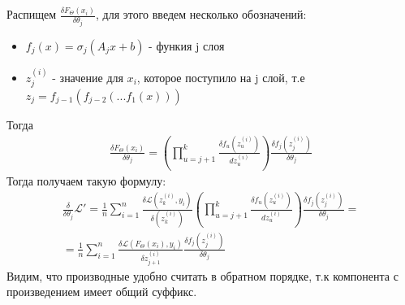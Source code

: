 \documentclass{article}
\newcommand{\Li}{\mathscr{L}}
\begin{document}
Распищем $\frac{\delta F_{\Theta}(x_i)}{\delta \theta_j}$, для этого введем несколько обозначений:
\begin{itemize}
    \item $f_j(x) = \sigma_j(A_jx + b)$ - функия j слоя
    \item $z_{j}^{(i)}$ - значение для $x_i$, которое поступило на j слой, т.е $z_j = f_{j-1}(f_{j-2}(... f_1(x)))$
\end{itemize}    
Тогда 
\begin{align*}
    \frac{\delta F_{\Theta}(x_i)}{\delta \theta_j} = \left(\prod_{u = j + 1}^{k} \frac{\delta f_{u} (z_{u}^{(i)})}{d z_u^{(i)}}\right) \frac{\delta f_j(z_j^{(i)})}{\delta \theta_j}
\end{align*}
Тогда получаем такую формулу:
\begin{align}
    \frac{\delta}{\delta \theta_j}\Li' = 
    \frac{1}{n}  \sum_{i=1}^{n} \frac{\delta \Li(z_k^{(i)}, y_i)}{\delta(z_k^{(i)})} \left(\prod_{u = j + 1}^{k} \frac{\delta f_{u} (z_u^{(i)})}{d z_u^{(i)}}\right) \frac{\delta f_j(z_j^{(i)})}{\delta \theta_j} = \\
    =\frac{1}{n} \sum_{i=1}^{n} \frac{\delta \Li(F_{\Theta}(x_i), y_i)}{\delta z_{j+1}^{(i)}} \frac{\delta f_j(z_j^{(i)})}{\delta \theta_j}
\end{align}
Видим, что производные удобно считать в обратном порядке, т.к компонента с произведением 
имеет общий суффикс.
\end{document}
